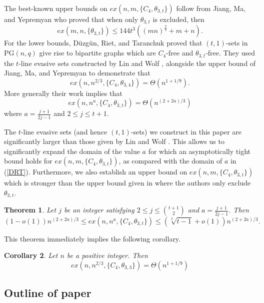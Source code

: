 \documentclass[12pt]{article}
\newtheorem{thm}{Theorem}[section]
\newtheorem{cor}[thm]{Corollary}
\begin{document}
The best-known upper bounds on $ex(n, m, \{C_4, \theta_{3, t} \})$ follow from Jiang, Ma,
and Yepremyan \cite{JiangMaYepremyan2022} who proved that when only $\theta_{3, t}$ is excluded, then
$$
ex(m, n, \{ \theta_{3, t} \}) \leq 144t^3((mn)^{\frac{2}{3}} + m + n).
$$
For the lower bounds, D\"{u}zg\"{u}n, Riet, and Taranchuk \cite{DuzgunRietTaranchuk2025} proved that $(t, 1)$-sets in PG$(n, q)$ give rise to bipartite graphs which are $C_4$-free and $\theta_{3, t}$-free. They used the $t$-line evasive sets constructed by Lin and Wolf \cite{LW}, alongside the upper bound of Jiang, Ma, and Yepremyan \cite{JiangMaYepremyan2022} to demonstrate that 
$$
ex(n, n^{2/3}, \{C_4, \theta_{3, 4}\}) = \Theta(n^{1 + 1/9}).
$$
More generally their work implies that
\begin{equation}\label{DRT}
ex(n, n^{a}, \{ C_4, \theta_{3, t} \}) = \Theta(n^{(2 + 2a)/3})    
\end{equation}
where  $a = \frac{j+1}{2j - 1}$ and $2 \leq j \leq t+1$.

The $t$-line evasive sets (and hence $(t, 1)$-sets) we construct in this paper are significantly larger than those given by Lin and Wolf \cite{LW}. This allows us to significantly expand the domain of the value $a$ for which an asymptotically tight bound holds for $ex(n, m, \{C_4, \theta_{3, t}\})$, as compared with the domain of $a$ in (\ref{DRT}). Furthermore, we also establish an upper bound on $ex(n, m, \{C_4, \theta_{3, t}\})$ which is stronger than the upper bound given in \cite{JiangMaYepremyan2022} where the authors only exclude $\theta_{3, t}$.

\begin{thm}\label{NoThetas}
    Let $j$ be an integer satisfying $2 \leq j \leq \binom{t + 1}{2}$ and $a = \frac{j+1}{2j - 1}$. Then
    $$
(1 - o(1))n^{(2 + 2a)/3} \leq ex(n, n^a, \{C_4, \theta_{3, t}\}) \leq (\sqrt[3]{t-1}+o(1))n^{(2 + 2a)/3}.
$$
\end{thm}

This theorem immediately implies the following corollary.


\begin{cor}\label{CorTheta}
    Let $n$ be a positive integer. Then
    $$
    ex(n, n^{2/3}, \{C_4, \theta_{3, 3} \}) = \Theta(n^{1 + 1/9})
    $$
\end{cor}




\subsection{Outline of paper}
\end{document}
